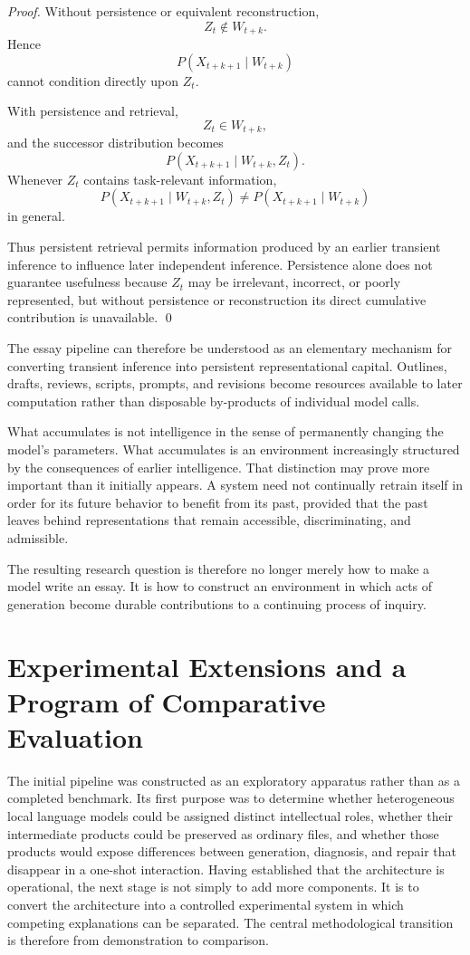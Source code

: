 \documentclass[11pt]{article}
\begin{document}
\begin{proof}
Without persistence or equivalent reconstruction,
\[
    Z_t\notin W_{t+k}.
\]
Hence
\[
    P(
        X_{t+k+1}
        \mid
        W_{t+k}
    )
\]
cannot condition directly upon \(Z_t\).

With persistence and retrieval,
\[
    Z_t\in W_{t+k},
\]
and the successor distribution becomes
\[
    P(
        X_{t+k+1}
        \mid
        W_{t+k},Z_t
    ).
\]
Whenever \(Z_t\) contains task-relevant information,
\[
    P(
        X_{t+k+1}
        \mid
        W_{t+k},Z_t
    )
    \neq
    P(
        X_{t+k+1}
        \mid
        W_{t+k}
    )
\]
in general.

Thus persistent retrieval permits information produced by an earlier transient inference to influence later independent inference. Persistence alone does not guarantee usefulness because \(Z_t\) may be irrelevant, incorrect, or poorly represented, but without persistence or reconstruction its direct cumulative contribution is unavailable. \qed
\end{proof}

The essay pipeline can therefore be understood as an elementary mechanism for converting transient inference into persistent representational capital. Outlines, drafts, reviews, scripts, prompts, and revisions become resources available to later computation rather than disposable by-products of individual model calls.

What accumulates is not intelligence in the sense of permanently changing the model's parameters. What accumulates is an environment increasingly structured by the consequences of earlier intelligence. That distinction may prove more important than it initially appears. A system need not continually retrain itself in order for its future behavior to benefit from its past, provided that the past leaves behind representations that remain accessible, discriminating, and admissible.

The resulting research question is therefore no longer merely how to make a model write an essay. It is how to construct an environment in which acts of generation become durable contributions to a continuing process of inquiry.

\section{Experimental Extensions and a Program of Comparative Evaluation}

The initial pipeline was constructed as an exploratory apparatus rather than as a completed benchmark. Its first purpose was to determine whether heterogeneous local language models could be assigned distinct intellectual roles, whether their intermediate products could be preserved as ordinary files, and whether those products would expose differences between generation, diagnosis, and repair that disappear in a one-shot interaction. Having established that the architecture is operational, the next stage is not simply to add more components. It is to convert the architecture into a controlled experimental system in which competing explanations can be separated. The central methodological transition is therefore from demonstration to comparison.
\end{document}
